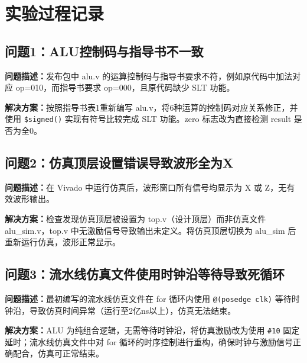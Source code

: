 \section{实验过程记录}

\subsection{问题1：ALU控制码与指导书不一致}
\textbf{问题描述：}发布包中 alu.v 的运算控制码与指导书要求不符，例如原代码中加法对应 op=010，而指导书要求 op=000，且原代码缺少 SLT 功能。

\textbf{解决方案：}按照指导书表1重新编写 alu.v，将6种运算的控制码对应关系修正，并使用 \texttt{\$signed()} 实现有符号比较完成 SLT 功能。zero 标志改为直接检测 result 是否为全0。

\subsection{问题2：仿真顶层设置错误导致波形全为X}
\textbf{问题描述：}在 Vivado 中运行仿真后，波形窗口所有信号均显示为 X 或 Z，无有效波形输出。

\textbf{解决方案：}检查发现仿真顶层被设置为 top.v（设计顶层）而非仿真文件 alu\_sim.v，top.v 中无激励信号导致输出未定义。将仿真顶层切换为 alu\_sim 后重新运行仿真，波形正常显示。

\subsection{问题3：流水线仿真文件使用时钟沿等待导致死循环}
\textbf{问题描述：}最初编写的流水线仿真文件在 for 循环内使用 \texttt{@(posedge clk)} 等待时钟沿，导致仿真时间异常（运行至2亿ns以上），仿真无法结束。

\textbf{解决方案：}ALU 为纯组合逻辑，无需等待时钟沿，将仿真激励改为使用 \texttt{\#10} 固定延时；流水线仿真文件中对 for 循环的时序控制进行重构，确保时钟与激励信号正确配合，仿真可正常结束。
